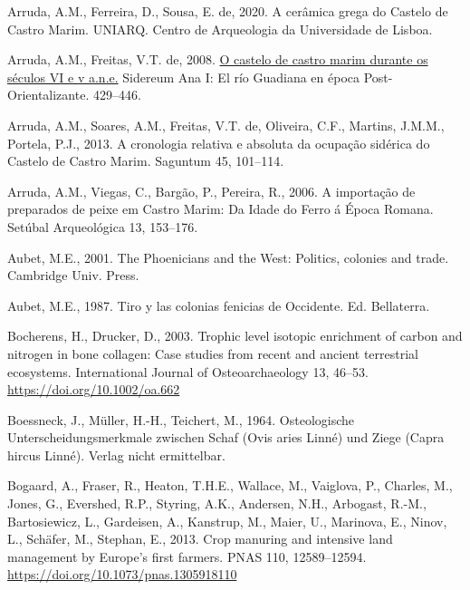 \documentclass[3p]{elsarticle} %
\newlength{\cslhangindent}
\newlength{\cslentryspacingunit} %
\newenvironment{CSLReferences}[2] %
 {%
  \setlength{\parindent}{0pt}
  \ifodd #1
  \let\oldpar\par
  \def\par{\hangindent=\cslhangindent\oldpar}
  \fi
  \setlength{\parskip}{#2\cslentryspacingunit}
 }%
 {}
\begin{document}
\begin{CSLReferences}{1}{0}
\leavevmode{}%
Arruda, A.M., Ferreira, D., Sousa, E. de, 2020. A cerâmica grega do {Castelo} de {Castro Marim}. {UNIARQ. Centro de Arqueologia da Universidade de Lisboa}.

\leavevmode{}%
Arruda, A.M., Freitas, V.T. de, 2008. \href{https://repositorio.ul.pt/handle/10451/9778}{O castelo de castro marim durante os séculos VI e v a.n.e.} Sidereum Ana I: El río Guadiana en época Post-Orientalizante. 429--446.

\leavevmode{}%
Arruda, A.M., Soares, A.M., Freitas, V.T. de, Oliveira, C.F., Martins, J.M.M., Portela, P.J., 2013. A cronologia relativa e absoluta da ocupação sidérica do {Castelo} de {Castro Marim}. Saguntum 45, 101--114.

\leavevmode{}%
Arruda, A.M., Viegas, C., Bargão, P., Pereira, R., 2006. A importação de preparados de peixe em {Castro Marim}: Da {Idade} do {Ferro} á {Época Romana}. Setúbal Arqueológica 13, 153--176.

\leavevmode{}%
Aubet, M.E., 2001. The {Phoenicians} and the {West}: Politics, colonies and trade. {Cambridge Univ. Press}.

\leavevmode{}%
Aubet, M.E., 1987. Tiro y las colonias fenicias de {Occidente}. {Ed. Bellaterra}.

\leavevmode{}%
Bocherens, H., Drucker, D., 2003. Trophic level isotopic enrichment of carbon and nitrogen in bone collagen: Case studies from recent and ancient terrestrial ecosystems. International Journal of Osteoarchaeology 13, 46--53. \url{https://doi.org/10.1002/oa.662}

\leavevmode{}%
Boessneck, J., Müller, H.-H., Teichert, M., 1964. Osteologische {Unterscheidungsmerkmale} zwischen {Schaf} ({Ovis} aries {Linné}) und {Ziege} ({Capra} hircus {Linné}). {Verlag nicht ermittelbar}.

\leavevmode{}%
Bogaard, A., Fraser, R., Heaton, T.H.E., Wallace, M., Vaiglova, P., Charles, M., Jones, G., Evershed, R.P., Styring, A.K., Andersen, N.H., Arbogast, R.-M., Bartosiewicz, L., Gardeisen, A., Kanstrup, M., Maier, U., Marinova, E., Ninov, L., Schäfer, M., Stephan, E., 2013. Crop manuring and intensive land management by {Europe}'s first farmers. PNAS 110, 12589--12594. \url{https://doi.org/10.1073/pnas.1305918110}


\end{CSLReferences}
\end{document}
